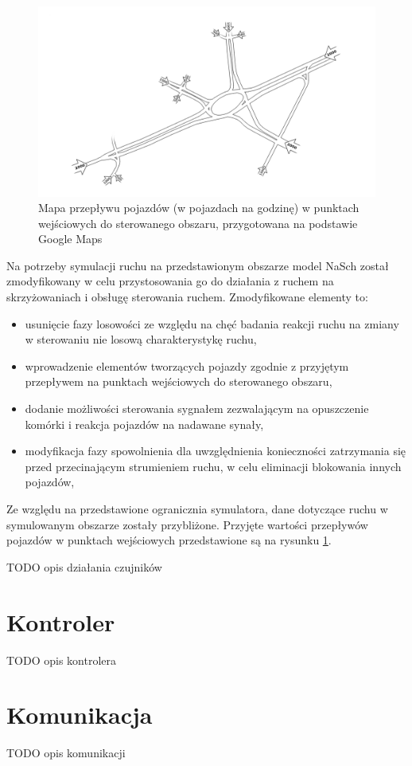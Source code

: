 \begin{figure}[h]
    \centering
    \includegraphics[width=1.0\textwidth]{images/mapa_ruch.png}
    \caption{Mapa przepływu pojazdów (w pojazdach na godzinę) w punktach wejściowych do sterowanego obszaru, przygotowana na podstawie Google Maps \cite{google_maps}}
    \label{fig:mapa_ruch}
\end{figure}

Na potrzeby symulacji ruchu na przedstawionym obszarze model NaSch został zmodyfikowany w celu przystosowania go do działania z ruchem na skrzyżowaniach i obsługę sterowania ruchem. Zmodyfikowane elementy to:
\begin{itemize}
	\item usunięcie fazy losowości ze względu na chęć badania reakcji ruchu na zmiany w sterowaniu nie losową charakterystykę ruchu,
	\item wprowadzenie elementów tworzących pojazdy zgodnie z przyjętym przepływem na punktach wejściowych do sterowanego obszaru,
	\item dodanie możliwości sterowania sygnałem zezwalającym na opuszczenie komórki i reakcja pojazdów na nadawane synały,
	\item modyfikacja fazy spowolnienia dla uwzględnienia konieczności zatrzymania się przed przecinającym strumieniem ruchu, w celu eliminacji blokowania innych pojazdów,
\end{itemize}

Ze względu na przedstawione ogranicznia symulatora, dane dotyczące ruchu w symulowanym obszarze zostały przybliżone. Przyjęte wartości przepływów pojazdów w punktach wejściowych przedstawione są na rysunku \ref{fig:mapa_ruch}.

TODO opis działania czujników

\section{Kontroler}
\label{chap:kontroler}
TODO opis kontrolera

\section{Komunikacja}
\label{chap:komunikacja}
TODO opis komunikacji